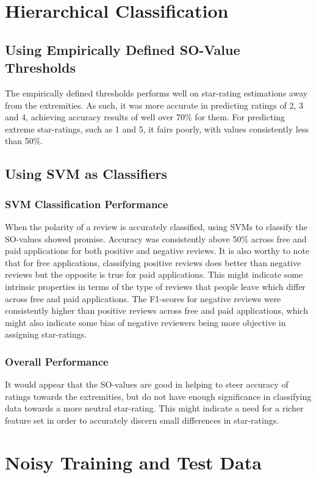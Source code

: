 \documentclass[11pt]{report} %
\begin{document}
	\section{Hierarchical Classification}
	\subsection{Using Empirically Defined SO-Value Thresholds}
The empirically defined thresholds performs well on star-rating estimations away from the extremities. As such, it was more accurate in predicting ratings of 2, 3 and 4, achieving accuracy results of well over 70\% for them. For predicting extreme star-ratings, such as 1 and 5, it fairs poorly, with values consistently less than 50\%.

	\subsection{Using SVM as Classifiers} 
\subsubsection{SVM Classification Performance}
When the polarity of a review is accurately classified, using SVMs to classify the SO-values showed promise. Accuracy was consistently above 50\% across free and paid applications for both positive and negative reviews. It is also worthy to note that for free applications, classifying positive reviews does better than negative reviews but the opposite is true for paid applications. This might indicate some intrinsic properties in terms of the type of reviews that people leave which differ across free and paid applications. The F1-scores for negative reviews were consistently higher than positive reviews across free and paid applications, which might also indicate some bias of negative reviewers being more objective in assigning star-ratings.
\subsubsection{Overall Performance}
It would appear that the SO-values are good in helping to steer accuracy of ratings towards the extremities, but do not have enough significance in classifying data towards a more neutral star-rating. This might indicate a need for a richer feature set in order to accurately discern small differences in star-ratings. 

	\section{Noisy Training and Test Data}
\end{document}
